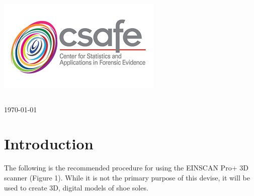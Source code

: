 \begin{titlepage}
\includegraphics[scale=.5]{Logo}\\[1cm]

\begin{center}
\begin{tabular}{ c   |   c }

\end{tabular}
\end{center}

{\large \today}\\[2cm] %



\vfill %

\end{titlepage}




\section{Introduction}

The following is the recommended procedure for using the EINSCAN Pro+ 3D scanner (Figure 1). While it is not the primary purpose of this devise, it will be used to create 3D, digital models of shoe soles.

